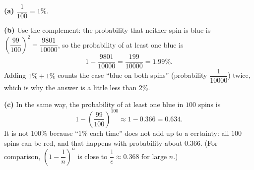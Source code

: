 \textbf{(a)} $\dfrac{1}{100}=1\%$.

\textbf{(b)} Use the complement: the probability that neither spin is blue is $\left(\dfrac{99}{100}\right)^2=\dfrac{9801}{10000}$, so the probability of at least one blue is
\[1-\dfrac{9801}{10000}=\boxed{\dfrac{199}{10000}}=1.99\%.\]
Adding $1\%+1\%$ counts the case ``blue on both spins'' (probability $\dfrac{1}{10000}$) twice, which is why the answer is a little less than $2\%$.

\textbf{(c)} In the same way, the probability of at least one blue in $100$ spins is
\[1-\left(\dfrac{99}{100}\right)^{100}\approx1-0.366=\boxed{0.634}.\]
It is not $100\%$ because ``$1\%$ each time'' does not add up to a certainty: all $100$ spins can be red, and that happens with probability about $0.366$. (For comparison, $\left(1-\dfrac1n\right)^n$ is close to $\dfrac1e\approx0.368$ for large $n$.)

